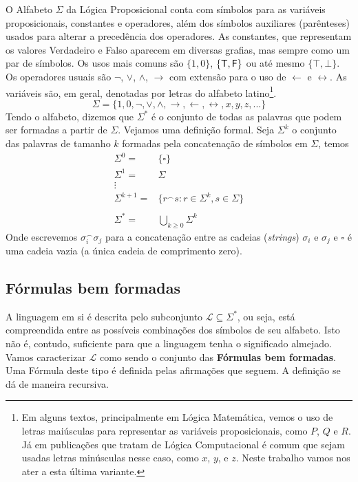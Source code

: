 \documentclass[12pt]{satyrus}
\begin{document}
   	O Alfabeto $\Sigma$ da Lógica Proposicional conta com símbolos para as variáveis proposicionais, constantes e operadores, além dos símbolos auxiliares (parênteses) usados para alterar a precedência dos operadores. As constantes, que representam os valores Verdadeiro e Falso aparecem em diversas grafias, mas sempre como um par de símbolos. Os usos mais comuns são $\{1, 0\}$, $\{\text{\sffamily T}, \text{\sffamily F}\}$ ou até mesmo $\{\top, \bot\}$. Os operadores usuais são $\neg$, $\vee$, $\wedge$, $\rightarrow$ com extensão para o uso de $\leftarrow$ e $\leftrightarrow$. As variáveis são, em geral, denotadas por letras do alfabeto latino\footnote{Em alguns textos, principalmente em Lógica Matemática\cite{logic}\cite{logic}, vemos o uso de letras maiúsculas para representar as variáveis proposicionais, como $P$, $Q$ e $R$. Já em publicações que tratam de Lógica Computacional\cite{logic}\cite{logic} é comum que sejam usadas letras minúsculas nesse caso, como $x$, $y$, e $z$. Neste trabalho vamos nos ater a esta última variante.}.
   		$$\Sigma = \{1, 0, \neg, \vee, \wedge, \rightarrow, \leftarrow, \leftrightarrow, x, y, z, ...\}$$
   	Tendo o alfabeto, dizemos que $\Sigma^{\ast}$ é o conjunto de todas as palavras que podem ser formadas a partir de $\Sigma$. Vejamos uma definição formal. Seja $\Sigma^{k}$ o conjunto das palavras de tamanho $k$ formadas pela concatenação de símbolos em $\Sigma$, temos
   		\begin{align*}
   		\Sigma^{0} =& \{\square\}\\
   		\Sigma^{1} =& \Sigma\\
   		 \vdots~&\\
   		\Sigma^{k + 1} =& \{r^{\frown}s: r \in \Sigma^{k}, s \in \Sigma\}\\
   		~\\
   		\Sigma^{\ast} =& \bigcup_{k \ge 0} \Sigma^{k}
   		\end{align*}
   	Onde escrevemos $\sigma_i^{\frown}\sigma_j$ para a concatenação entre as cadeias (\textit{strings}) $\sigma_i$ e $\sigma_j$ e $\square$ é uma cadeia vazia (a única cadeia de comprimento zero).
  
   	
   	\subsection{Fórmulas bem formadas}
   	
   	A linguagem em si é descrita pelo subconjunto $\mathscr{L} \subseteq \Sigma^{\ast}$, ou seja, está compreendida entre as possíveis combinações dos símbolos de seu alfabeto. Isto não é, contudo, suficiente para que a linguagem tenha o significado almejado. Vamos caracterizar $\mathscr{L}$ como sendo o conjunto das \textbf{Fórmulas bem formadas}. Uma Fórmula deste tipo é definida pelas afirmações que seguem. A definição se dá de maneira recursiva.
   	
\end{document}
